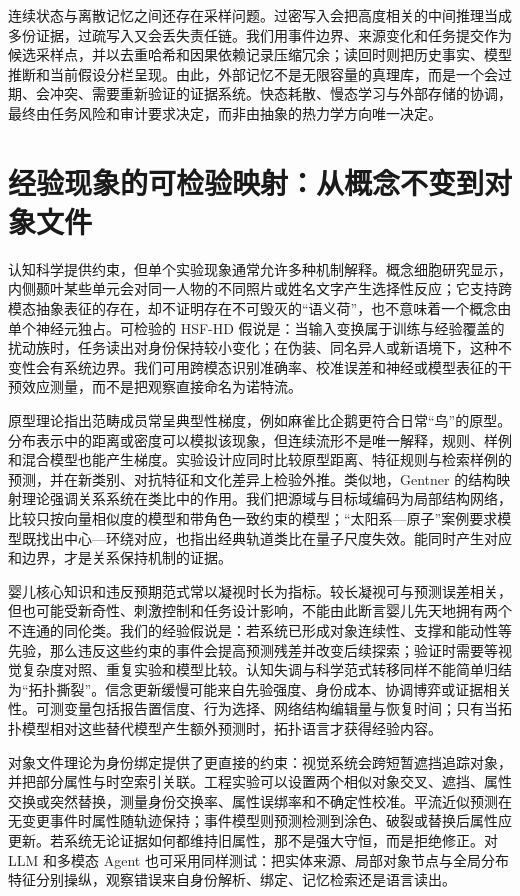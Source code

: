 连续状态与离散记忆之间还存在采样问题。过密写入会把高度相关的中间推理当成多份证据，过疏写入又会丢失责任链。我们用事件边界、来源变化和任务提交作为候选采样点，并以去重哈希和因果依赖记录压缩冗余；读回时则把历史事实、模型推断和当前假设分栏呈现。由此，外部记忆不是无限容量的真理库，而是一个会过期、会冲突、需要重新验证的证据系统。快态耗散、慢态学习与外部存储的协调，最终由任务风险和审计要求决定，而非由抽象的热力学方向唯一决定。

\section{经验现象的可检验映射：从概念不变到对象文件}

认知科学提供约束，但单个实验现象通常允许多种机制解释。概念细胞研究显示，内侧颞叶某些单元会对同一人物的不同照片或姓名文字产生选择性反应；它支持跨模态抽象表征的存在，却不证明存在不可毁灭的“语义荷”，也不意味着一个概念由单个神经元独占。可检验的 HSF-HD 假说是：当输入变换属于训练与经验覆盖的扰动族时，任务读出对身份保持较小变化；在伪装、同名异人或新语境下，这种不变性会有系统边界。我们可用跨模态识别准确率、校准误差和神经或模型表征的干预效应测量，而不是把观察直接命名为诺特流。

原型理论指出范畴成员常呈典型性梯度，例如麻雀比企鹅更符合日常“鸟”的原型。分布表示中的距离或密度可以模拟该现象，但连续流形不是唯一解释，规则、样例和混合模型也能产生梯度。实验设计应同时比较原型距离、特征规则与检索样例的预测，并在新类别、对抗特征和文化差异上检验外推。类似地，Gentner 的结构映射理论强调关系系统在类比中的作用。我们把源域与目标域编码为局部结构网络，比较只按向量相似度的模型和带角色一致约束的模型；“太阳系—原子”案例要求模型既找出中心—环绕对应，也指出经典轨道类比在量子尺度失效。能同时产生对应和边界，才是关系保持机制的证据。

婴儿核心知识和违反预期范式常以凝视时长为指标。较长凝视可与预测误差相关，但也可能受新奇性、刺激控制和任务设计影响，不能由此断言婴儿先天地拥有两个不连通的同伦类。我们的经验假说是：若系统已形成对象连续性、支撑和能动性等先验，那么违反这些约束的事件会提高预测残差并改变后续探索；验证时需要等视觉复杂度对照、重复实验和模型比较。认知失调与科学范式转移同样不能简单归结为“拓扑撕裂”。信念更新缓慢可能来自先验强度、身份成本、协调博弈或证据相关性。可测变量包括报告置信度、行为选择、网络结构编辑量与恢复时间；只有当拓扑模型相对这些替代模型产生额外预测时，拓扑语言才获得经验内容。

对象文件理论为身份绑定提供了更直接的约束：视觉系统会跨短暂遮挡追踪对象，并把部分属性与时空索引关联。工程实验可以设置两个相似对象交叉、遮挡、属性交换或突然替换，测量身份交换率、属性误绑率和不确定性校准。平流近似预测在无变更事件时属性随轨迹保持；事件模型则预测检测到涂色、破裂或替换后属性应更新。若系统无论证据如何都维持旧属性，那不是强大守恒，而是拒绝修正。对 LLM 和多模态 Agent 也可采用同样测试：把实体来源、局部对象节点与全局分布特征分别操纵，观察错误来自身份解析、绑定、记忆检索还是语言读出。

